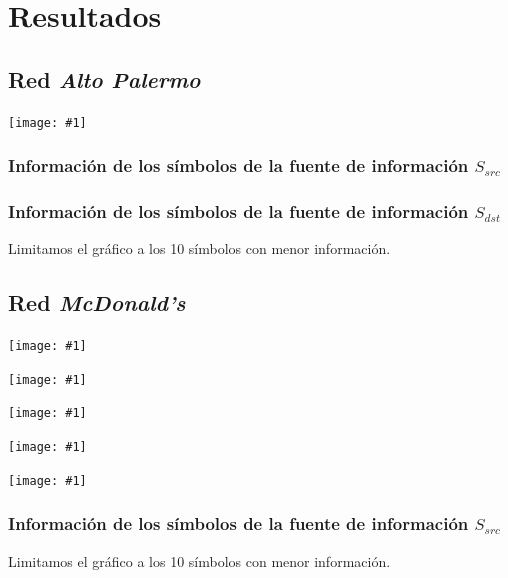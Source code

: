 \documentclass[a4paper, 10pt, twoside]{article}
\newcommand{\grafo}[1]{
  \texttt{[image: \#1]}
}
\begin{document}
\section{Resultados}




\subsection{Red \emph{Alto Palermo}}

\grafo{altopalermo}


\subsubsection{Información de los símbolos de la fuente de información $S_{src}$}


\vspace{2cm}


\subsubsection{Información de los símbolos de la fuente de información $S_{dst}$}

Limitamos el gráfico a los 10 símbolos con menor información.


\vspace{2cm}




\subsection{Red \emph{McDonald's}}

\grafo{mcdonalds}

\grafo{mcdonalds-172.17.12.2}

\grafo{mcdonalds-172.17.12.1}

\grafo{mcdonalds-172.17.203.1}

\grafo{mcdonalds-0.0.0.0}


\subsubsection{Información de los símbolos de la fuente de información $S_{src}$}

Limitamos el gráfico a los 10 símbolos con menor información.
\end{document}

